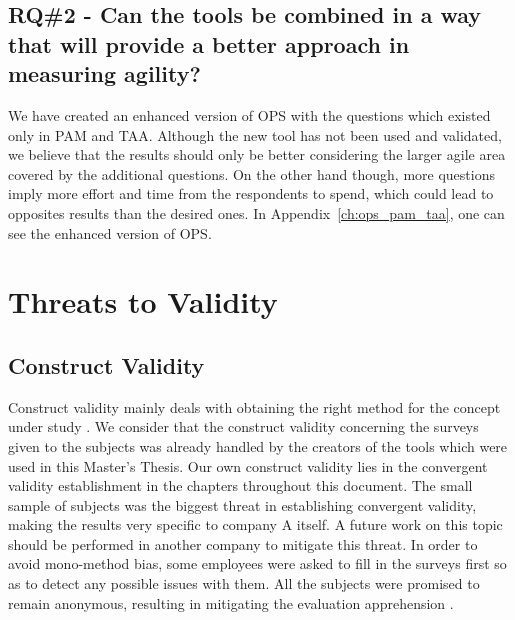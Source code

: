 \subsection{RQ\#2 - Can the tools be combined in a way that will provide a better approach in measuring agility?}

We have created an enhanced version of \ac{OPS} with the questions which existed only in \ac{PAM} and \ac{TAA}. Although the new tool has not been used and validated, we believe that the results should only be better considering the larger agile area covered by the additional questions. On the other hand though, more questions imply more effort and time from the respondents to spend, which could lead to opposites results than the desired ones. In Appendix~\ref{ch:ops_pam_taa}, one can see the enhanced version of \ac{OPS}.

\section{Threats to Validity}

\subsection{Construct Validity}
Construct validity mainly deals with obtaining the right method for the concept under study \cite{Wohlin}. We consider that the construct validity concerning the surveys given to the subjects was already handled by the creators of the tools which were used in this Master's Thesis. Our own construct validity lies in the convergent validity establishment in the chapters throughout this document. The small sample of subjects was the biggest threat in establishing convergent validity, making the results very specific to company A itself. A future work on this topic should be performed in another company to mitigate this threat. In order to avoid mono-method bias, some employees were asked to fill in the surveys first so as to detect any possible issues with them. All the subjects were promised to remain anonymous, resulting in mitigating the evaluation apprehension \cite{wohlin2012expse}. 

